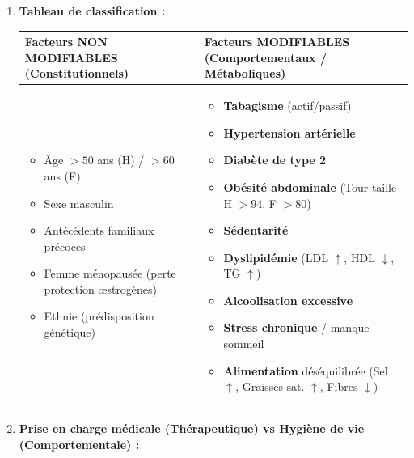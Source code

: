 \documentclass[11pt]{article}
\begin{document}
\begin{corrige}
\begin{enumerate}
    \item \textbf{Tableau de classification :}
    \begin{center}
    \begin{tabularx}{\linewidth}{|X|X|}\hline
    \rowcolor{popblueL}
    \textbf{Facteurs NON MODIFIABLES (Constitutionnels)} & \textbf{Facteurs MODIFIABLES (Comportementaux / Métaboliques)} \\ \hline
    \begin{itemize}
        \item Âge $> 50$ ans (H) / $> 60$ ans (F)
        \item Sexe masculin
        \item Antécédents familiaux précoces
        \item Femme ménopausée (perte protection œstrogènes)
        \item Ethnie (prédisposition génétique)
    \end{itemize} &
    \begin{itemize}
        \item \textbf{Tabagisme} (actif/passif)
        \item \textbf{Hypertension artérielle}
        \item \textbf{Diabète de type 2}
        \item \textbf{Obésité abdominale} (Tour taille H $> 94$, F $> 80$)
        \item \textbf{Sédentarité}
        \item \textbf{Dyslipidémie} (LDL $\uparrow$, HDL $\downarrow$, TG $\uparrow$)
        \item \textbf{Alcoolisation excessive}
        \item \textbf{Stress chronique} / manque sommeil
        \item \textbf{Alimentation} déséquilibrée (Sel $\uparrow$, Graisses sat. $\uparrow$, Fibres $\downarrow$)
    \end{itemize} \\ \hline
    \end{tabularx}
    \end{center}
    \item \textbf{Prise en charge médicale (Thérapeutique) vs Hygiène de vie (Comportementale) :}
    \begin{center}
    \begin{tabularx}{\linewidth}{|X|X|X|}\hline

\end{tabularx}
\end{center}
\end{enumerate}
\end{corrige}
\end{document}
